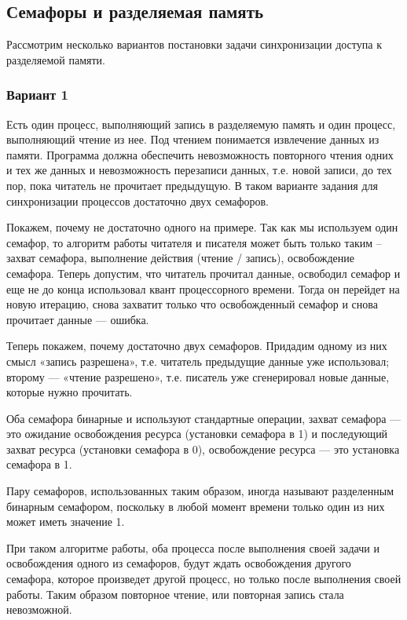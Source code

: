 \documentclass[a4paper]{article}
\begin{document}
\subsection{Семафоры и разделяемая память}
	Рассмотрим несколько вариантов постановки задачи синхронизации доступа к разделяемой памяти.
	
	\subsubsection{Вариант 1}	
	Есть один процесс, выполняющий запись в разделяемую память и один процесс, выполняющий чтение из нее. Под чтением понимается извлечение данных из памяти. Программа должна обеспечить невозможность повторного чтения одних и тех же данных и невозможность перезаписи данных, т.е. новой записи, до тех пор, пока читатель не прочитает предыдущую.
В таком варианте задания для синхронизации процессов достаточно двух семафоров.

	Покажем, почему не достаточно одного на примере. Так как мы используем один семафор, то алгоритм работы читателя и писателя может быть только таким – захват семафора, выполнение действия (чтение / запись), освобождение семафора. Теперь допустим, что читатель прочитал данные, освободил семафор и еще не до конца использовал квант процессорного времени. Тогда он перейдет на новую итерацию, снова захватит только что освобожденный семафор и снова прочитает данные --– ошибка.
	
	Теперь покажем, почему достаточно двух семафоров. Придадим одному из них смысл «запись разрешена», т.е. читатель предыдущие данные уже использовал; второму –-- «чтение разрешено», т.е. писатель уже сгенерировал новые данные, которые нужно прочитать.
	
	Оба семафора бинарные и используют стандартные операции, захват семафора --– это ожидание освобождения ресурса (установки семафора в 1) и последующий захват ресурса (установки семафора в 0), освобождение ресурса --– это установка семафора в 1.

	Пару семафоров, использованных таким образом, иногда называют разделенным бинарным семафором, поскольку в любой момент времени только один из них может иметь значение 1.
	
	При таком алгоритме работы, оба процесса после выполнения своей задачи и освобождения одного из семафоров, будут ждать освобождения другого семафора, которое произведет другой процесс, но только после выполнения своей работы. Таким образом повторное чтение, или повторная запись стала невозможной.
	
\end{document}

